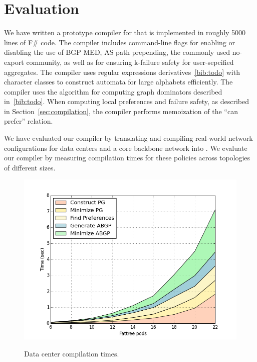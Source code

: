 \section{Evaluation}

We have written a prototype compiler for \sysname that is implemented in roughly 5000 lines of F\# code. The compiler includes command-line flags for enabling or disabling the use of BGP MED, AS path prepending, the commonly used no-export community, as well as for ensuring k-failure safety for user-sepcified aggregates. The compiler uses regular expressions derivatives~\ref{bib:todo} with character classes to construct automata for large alphabets efficiently. The compiler uses the algorithm for computing graph dominators described in~\ref{bib:todo}. When computing local preferences and failure safety, as described in Section~\ref{sec:compilation}, the compiler performs memoization of the ``can prefer'' relation. 

We have evaluated our compiler by translating and compiling real-world network configurations for data centers and a core backbone network into \sysname. We evaluate our compiler by measuring compilation times for these policies across topologies of different sizes.

\begin{figure}[t!]
\centering
\includegraphics[width=\columnwidth]{figures/compilation-times-dc.png}
\label{fig:compilation-times-dc}
\caption{Data center compilation times.}
\end{figure}